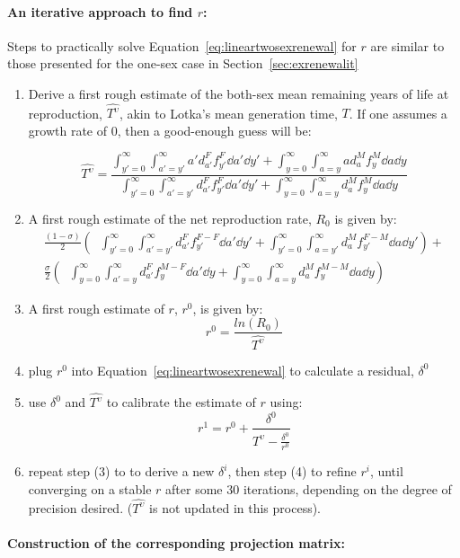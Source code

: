 \paragraph{An iterative approach to find $r$:}
\label{sec:exrenewalit2}
Steps to practically solve Equation~\eqref{eq:lineartwosexrenewal} for $r$ are
similar to those presented for the one-sex case in
Section~\ref{sec:exrenewalit}
\begin{enumerate}
  \item Derive a first rough estimate of the both-sex mean remaining years of
  life at reproduction, $\widehat{T^\upsilon}$, akin to Lotka's mean generation time,
  $T$. If one assumes a growth rate of $0$, then a good-enough guess will be:

\begin{equation}
\widehat{T^\upsilon} = \frac{\int _{y'=0}^\infty \int _{a'=y'}^\infty a'
d_{a'}^F f_{y'}^F \dd a' \dd y' + \int _{y=0}^\infty \int _{a=y}^\infty a
d_{a}^M f_{y}^M \dd a \dd y}{\int _{y'=0}^\infty \int _{a'=y'}^\infty
d_{a'}^F f_{y'}^F \dd a' \dd y' + \int _{y=0}^\infty \int _{a=y}^\infty
d_{a}^M f_{y}^M \dd a \dd y}
\end{equation}

  \item A first rough estimate of the net reproduction rate, $R_0$ is given by:
 \begin{equation}
 \begin{split}
 \frac{(1 - \sigma)}{2} \left(\;\;
            \int _{y'=0}^\infty \int _{a'=y'}^\infty 
                      d_{a'}^F f_{y'}^{F-F} \dd a' \dd y' + 
            \int _{y'=0}^\infty \int _{a=y'}^\infty 
                      d_{a}^M f_{y'}^{F-M} \dd a \dd y'\right) + \\ 
     \frac{\sigma}{2} \left(\;\;
            \int _{y=0}^\infty \int _{a'=y}^\infty 
                      d_{a'}^F f_{y}^{M-F} \dd a' \dd y + 
            \int _{y=0}^\infty \int _{a=y}^\infty 
                      d_{a}^M f_{y}^{M-M} \dd a \dd y \right)
 \end{split}
 \end{equation}
  \item A first rough estimate of $r$, $r^0$, is given by:
   \begin{equation}
   r^0 = \frac{ln(R_0)}{\widehat{T^\upsilon}}
   \end{equation}
  \item plug $r^0$ into Equation~\ref{eq:lineartwosexrenewal} to calculate a
  residual, $\delta^0$
  \item use $\delta^0$ and $\widehat{T^\upsilon}$ to calibrate the estimate of $r$
  using:
  \begin{equation}
  r^{1} = r^0 + \frac{\delta^0}{\widehat{T^\upsilon} - \frac{\delta^0}{r^0}}
  \end{equation}
  \item repeat step (3) to to derive a new $\delta^i$, then step (4) to refine
  $r^i$, until converging on a stable $r$ after some 30 iterations,
  depending on the degree of precision desired. ($\widehat{T^\upsilon}$ is not updated
  in this process).
\end{enumerate}

\paragraph{Construction of the corresponding projection matrix:}

